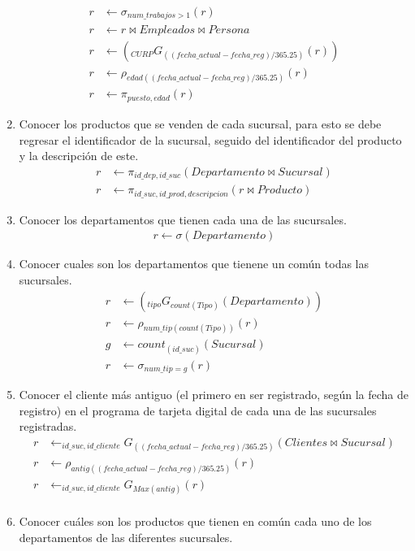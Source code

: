 \documentclass{article}
\begin{document}
\begin{enumerate}
{\begin{align*}
                r &\leftarrow \sigma_{num\_trabajos>1}(r)\\
                r &\leftarrow r \bowtie Empleados \bowtie Persona \\
                r &\leftarrow (_{CURP}G_{((fecha\_actual-fecha\_reg)/365.25)}(r))\\
                r &\leftarrow \rho_{edad((fecha\_actual-fecha\_reg)/365.25)}(r) \\
                r &\leftarrow \pi_{puesto, edad}(r)
            \end{align*}
        }
        \item {
            Conocer los productos que se venden de cada sucursal, para esto se 
            debe regresar el identificador de la sucursal, seguido del
            identificador del producto y la descripción de este.
            \begin{align*}
                r &\leftarrow \pi_{id\_dep, id\_suc}(Departamento \bowtie Sucursal)\\
                r &\leftarrow \pi_{id\_suc, id\_prod, descripcion}(r \bowtie Producto)
            \end{align*}
        }
        \item {
            Conocer los departamentos que tienen cada una de las sucursales.
            \begin{align*}
                r \leftarrow \sigma(Departamento)
            \end{align*}
        }
        \item {
            Conocer cuales son los departamentos que tienene un común todas las 
            sucursales.
            \begin{align*}
                r &\leftarrow (_{tipo}G_{count(Tipo)}(Departamento)) \\
                r &\leftarrow \rho_{num\_tip(count(Tipo))}(r) \\
                g &\leftarrow count_{(id\_suc)}(Sucursal) \\
                r &\leftarrow \sigma_{num\_tip = g}(r)
            \end{align*}
        }
        \item {
            Conocer el cliente más antiguo (el primero en ser registrado, según
            la fecha de registro) en el programa de tarjeta digital de cada una
            de las sucursales registradas.
            \begin{align*}
            r &\leftarrow _{id\_suc,id\_cliente}G_{((fecha\_actual-fecha\_reg)/365.25)}(Clientes \bowtie Sucursal)\\
            r &\leftarrow \rho_{antig((fecha\_actual-fecha\_reg)/365.25)}(r)\\
            r &\leftarrow _{id\_suc,id\_cliente}G_{Max(antig)} (r) \\           
            \end{align*}
        }
        \item {
            Conocer cuáles son los productos que tienen en común cada uno de los
            departamentos de las diferentes sucursales.
            
}
\end{enumerate}
\end{document}
